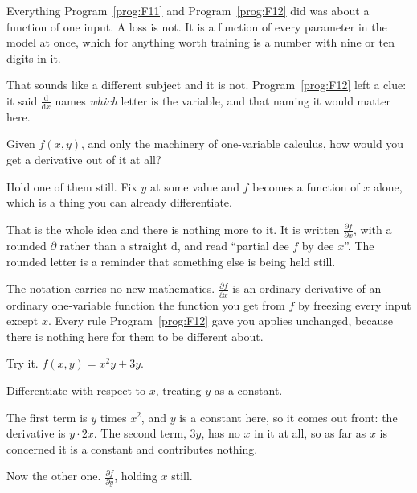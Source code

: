 \begin{fr}
Everything Program~\ref{prog:F11} and Program~\ref{prog:F12} did was about a
function of one input. A loss is not. It is a function of every parameter in
the model at once, which for anything worth training is a number with nine or
ten digits in it.

That sounds like a different subject and it is not. Program~\ref{prog:F12}
left a clue: it said $\frac{\mathrm{d}}{\mathrm{d}x}$ names \emph{which}
letter is the variable, and that naming it would matter here.

Given $f(x, y)$, and only the machinery of one-variable calculus, how would
you get a derivative out of it at all?
\dotline
\nextframe
\end{fr}

\begin{fr}
\begin{ansblock}
Hold one of them still. Fix $y$ at some value and $f$ becomes a function of
$x$ alone, which is a thing you can already differentiate.
\end{ansblock}

That is the whole idea and there is nothing more to it. It is written
$\frac{\partial f}{\partial x}$, with a rounded $\partial$ rather than a
straight $\mathrm{d}$, and read \enquote{partial dee $f$ by dee $x$}. The
rounded letter is a reminder that something else is being held still.

\begin{note}
The notation carries no new mathematics. $\frac{\partial f}{\partial x}$ is
an ordinary derivative of an ordinary one-variable function \dash{} the
function you get from $f$ by freezing every input except $x$. Every rule
Program~\ref{prog:F12} gave you applies unchanged, because there is nothing
here for them to be different about.
\end{note}

\end{fr}

\begin{fr}
Try it. $f(x, y) = x^{2}y + 3y$.

Differentiate with respect to $x$, treating $y$ as a constant.
\dotline
\nextframe
\end{fr}

\begin{fr}
The first term is $y$ times $x^{2}$, and $y$ is a constant here, so it comes
out front: the derivative is $y \cdot 2x$. The second term, $3y$, has no $x$
in it at all, so as far as $x$ is concerned it is a constant and contributes
nothing.

Now the other one. $\frac{\partial f}{\partial y}$, holding $x$ still.
\nextframe
\end{fr}

